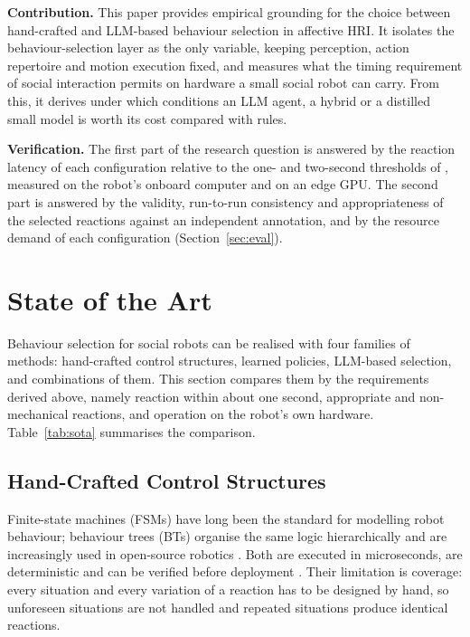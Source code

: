 \documentclass[conference]{IEEEtran}
\begin{document}
\textbf{Contribution.} This paper provides empirical grounding for the
choice between hand-crafted and LLM-based behaviour selection in affective
HRI. It isolates the behaviour-selection layer as the only variable, keeping
perception, action repertoire and motion execution fixed, and measures what
the timing requirement of social interaction permits on hardware a small
social robot can carry. From this, it derives under which conditions an LLM
agent, a hybrid or a distilled small model is worth its cost compared with
rules.

\textbf{Verification.} The first part of the research question is answered
by the reaction latency of each configuration relative to the one- and
two-second thresholds of \cite{Shiwa2008Respond}, measured on the robot's
onboard computer and on an edge GPU. The second part is answered by the
validity, run-to-run consistency and appropriateness of the selected
reactions against an independent annotation, and by the resource demand of
each configuration (Section~\ref{sec:eval}).

\section{State of the Art}

Behaviour selection for social robots can be realised with four families of
methods: hand-crafted control structures, learned policies, LLM-based
selection, and combinations of them. This section compares them by the
requirements derived above, namely reaction within about one second,
appropriate and non-mechanical reactions, and operation on the robot's own
hardware. Table~\ref{tab:sota} summarises the comparison.

\subsection{Hand-Crafted Control Structures}
Finite-state machines (FSMs) have long been the standard for modelling robot
behaviour; behaviour trees (BTs) organise the same logic hierarchically and
are increasingly used in open-source robotics
\cite{Ghzouli2023BTSM,Iovino2022BTSurvey}. Both are executed in
microseconds, are deterministic and can be verified before deployment
\cite{Iovino2022BTSurvey}. Their limitation is coverage: every situation and
every variation of a reaction has to be designed by hand, so unforeseen
situations are not handled and repeated situations produce identical
reactions.
\end{document}
